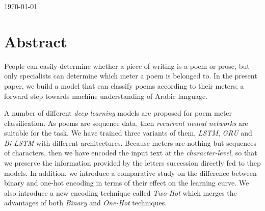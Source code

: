 \documentclass[12pt]{report}
\begin{document}
\begin{titlepage}


{\large \today}\\[2cm] %


\vfill %

\end{titlepage}










\section*{Abstract}

People can easily determine whether a piece of writing is
a poem or prose, but only specialists can determine which 
meter a poem is belonged to. 
In the present paper, we build a model that can classify poems
according to their meters; a forward step towards machine understanding of Arabic language.

A number of different \textit{deep learning} models are proposed for poem meter
classification. As poems are sequence data, then \textit{recurrent neural
networks} are suitable for the task.  We have trained three variants of them,
\textit{LSTM}, \textit{GRU} and \textit{Bi-LSTM} with different architectures.
Because meters are nothing but sequences of characters,
then we have encoded the input text at the \textit{character-level},
so that we preserve the information provided by the letters succession directly fed to thep models. In addition,
we introduce a comparative study on the difference between binary and one-hot encoding
in terms of their effect on the learning curve. 
We also introduce a new encoding technique called \textit{Two-Hot} which 
merges the advantages of both \textit{Binary} and \textit{One-Hot} techniques.
\end{document}
